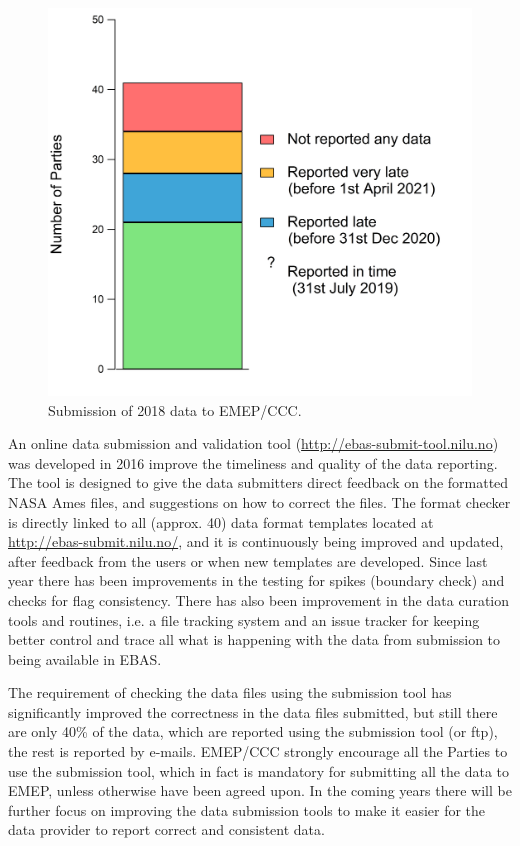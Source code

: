 \begin{figure}[h]
\centering
\includegraphics[width=0.45\paperwidth]{FIGS_Obs/reported.png}
\caption{\label{fig:Submission}Submission of 2018 data to EMEP/CCC.}
 \end{figure}

An online data submission and validation tool (\url{http://ebas-submit-tool.nilu.no}) was developed in 2016 improve  the timeliness and quality of the data reporting. The tool is designed to give the data submitters direct feedback on the formatted NASA Ames files, and suggestions on how to correct the files.  The format checker is directly linked to all (approx. 40) data format templates located at \url{http://ebas-submit.nilu.no/}, and it  is continuously being improved and updated, after feedback from the users or when new templates are developed. Since last year there has been improvements in the testing for spikes (boundary check) and checks for flag consistency. There has also been improvement in the data curation tools and routines, i.e. a file tracking system and an issue tracker for keeping better control and trace all what is happening with the data from submission to being available in EBAS. 

The requirement of checking the data files using the submission tool has significantly improved the correctness in the data files submitted, but still there are only 40\% of the data, which are reported using the submission tool (or ftp), the rest is reported by e-mails. EMEP/CCC strongly encourage all the Parties to use the submission tool, which in fact is mandatory for submitting all the data to EMEP, unless otherwise have been agreed upon. In the coming years there will be further focus on improving the data submission tools to make it easier for the data provider to report correct and consistent data. 


